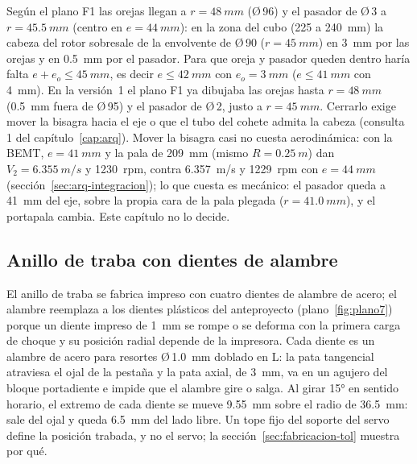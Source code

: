 \begin{nota}
Según el plano F1 las orejas llegan a $r=\SI{48}{mm}$ (Ø\,96) y el pasador de Ø\,3 a $r=\SI{45.5}{mm}$
(centro en $e=\SI{44}{mm}$): en la zona del cubo (225 a \SI{240}{mm}) la cabeza del rotor sobresale de la
envolvente de Ø\,90 ($r=\SI{45}{mm}$) en \SI{3}{mm} por las orejas y en \SI{0.5}{mm} por el pasador. Para que
oreja y pasador queden dentro haría falta $e+e_o\le\SI{45}{mm}$, es decir $e\le\SI{42}{mm}$ con
$e_o=\SI{3}{mm}$ ($e\le\SI{41}{mm}$ con \SI{4}{mm}). En la versión~1 el plano F1 ya dibujaba las orejas hasta
$r=\SI{48}{mm}$ (\SI{0.5}{mm} fuera de Ø\,95) y el pasador de Ø\,2, justo a $r=\SI{45}{mm}$. Cerrarlo
exige mover la bisagra hacia el eje o que el tubo del cohete
admita la cabeza (consulta 1 del capítulo~\ref{cap:arq}). Mover la bisagra casi no cuesta aerodinámica: con la BEMT, $e=\SI{41}{mm}$
y la pala de \SI{209}{mm} (mismo $R=\SI{0.25}{m}$) dan $V_2=\SI{6.355}{m/s}$ y \num{1230}~rpm, contra \SI{6.357}{m/s} y \num{1229}~rpm con
$e=\SI{44}{mm}$ (sección~\ref{sec:arq-integracion}); lo que cuesta es mecánico: el pasador queda a \SI{41}{mm} del eje, sobre la propia
cara de la pala plegada ($r=\SI{41.0}{mm}$), y el portapala cambia. Este capítulo no lo decide.
\end{nota}

\subsection{Anillo de traba con dientes de alambre}\label{sec:fabricacion-anillo}

El anillo de traba se fabrica impreso con cuatro dientes de alambre de acero; el alambre
reemplaza a los dientes plásticos del anteproyecto (plano~\ref{fig:plano7}) porque un
diente impreso de \SI{1}{mm} se rompe o se deforma con la primera carga de choque y su
posición radial depende de la impresora. Cada diente es un alambre de acero para resortes
Ø\,\SI{1.0}{mm} doblado en L: la pata tangencial atraviesa el ojal de la pestaña y la pata
axial, de \SI{3}{mm}, va en un agujero del bloque portadiente e impide que el alambre gire
o salga. Al girar \ang{15} en sentido horario, el extremo de cada diente se mueve
\SI{9.55}{mm} sobre el radio de \SI{36.5}{mm}: sale del ojal y queda \SI{6.5}{mm} del lado
libre. Un tope fijo del soporte del servo define la posición trabada, y no el servo; la
sección~\ref{sec:fabricacion-tol} muestra por qué.

